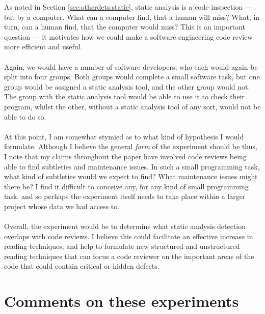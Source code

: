 As noted in Section \ref{sec:otherdets:static}, static analysis is a code inspection --- but by a
computer.
What can a computer find, that a human will miss?
What, in turn, can a human find, that the computer would miss?
This is an important question --- it motivates how we could make a software engineering code review
more efficient and useful.\\
\\
Again, we would have a number of software developers, who each would again be split into four
groups.
Both groups would complete a small software task, but one group would be assigned a static analysis
tool, and the other group would not.
The group with the static analysis tool would be able to use it to check their program, whilst the
other, without a static analysis tool of any sort, would not be able to do so.\\
\\
At this point, I am somewhat stymied as to what kind of hypothesis I would formulate.
Although I believe the general {\em form} of the experiment should be thus, I note that my claims
throughout the paper have involved code reviews being able to find subtleties and maintenance
issues.
In such a small programming task, what kind of subtleties would we expect to find?
What maintenance issues might there be?
I find it difficult to conceive any, for any kind of small programming task, and so perhaps the
experiment itself needs to take place within a larger project whose data we had access to.\\
\\
Overall, the experiment would be to determine what static analysis detection overlaps with code
reviews.
I believe this could facilitate an effective increase in reading techniques, and help to formulate
new structured and unstructured reading techniques that can focus a code reviewer on the important
areas of the code that could contain critical or hidden defects.

\section{Comments on these experiments}

